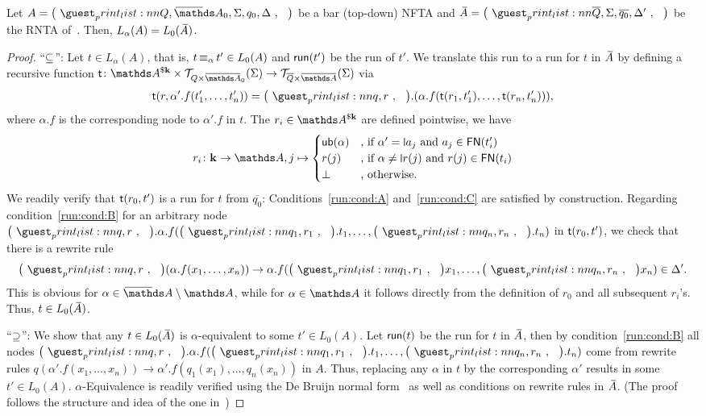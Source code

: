 \documentclass[a4paper,UKenglish,cleveref,autoref,thm-restate,numberwithinsect,final]{lipics-v2021}
\begin{document}
    \begin{proposition}
      Let $A = \maketuple{Q, \barNames_0, \Sigma, q_0, \Delta}$ be a bar (top-down) NFTA and $\barA =
      \maketuple{\overline{Q}, \Sigma, \overline{q_0}, \Delta'}$ be the RNTA of~. Then,
      $L_\alpha(A) = L_0(\barA)$.
    \end{proposition}
    \begin{proof}
      \noindent\enquote{$\subseteq$}: Let $t \in L_\alpha(A)$, that is, $t \operatorname{\equiv_{\alpha}} t' \in L_0(A)$ and $\textsf{run}(t')$
      be the run of $t'$. We translate this run to a run for $t$ in $\barA$ by defining a recursive function
      $\trans\colon \parnom{k} \times \bartree[Q \times \barNamess_0](\Sigma) \to \bartree[\overline{Q} \times
      \barNamess](\Sigma)$ via
      \[ \trans(r, \alpha'.f(t'_1, \dots, t'_n)) = \maketuple{q, r}.(\alpha.f(\trans(r_1, t'_1), \dots, \trans(r_n, t'_n))), \]
      where $\alpha.f$ is the corresponding node to $\alpha'.f$ in $t$. The $r_i \in \parnom{k}$ are defined pointwise,
      we have
      \[ r_i\colon \mathbf{k} \to \names, j \mapsto \begin{cases}
        \ub(\alpha) & \text{, if $\alpha' = \newletter{a_j}$ and $a_j \in \FN(t_i')$} \\
        r(j) & \text{, if $\alpha \neq \newletter{r(j)}$ and $r(j) \in \FN(t_i)$} \\
        \bot & \text{, otherwise.}
      \end{cases} \]
      We readily verify that $\mathsf{t}(r_0, t')$ is a run for $t$ from $\overline{q_0}$: Conditions~\ref{run:cond:A}
      and~\ref{run:cond:C} are satisfied by construction. Regarding condition~\ref{run:cond:B} for an arbitrary
      node $\maketuple{q,r}.\alpha.f(\maketuple{q_1, r_1}.t_1, \dots, \maketuple{q_n, r_n}.t_n)$ in $\mathsf{t}(r_0, t')$,
      we check that there is a rewrite rule \[\maketuple{q,r}(\alpha.f(x_1, \dots, x_n)) \to \alpha.f(\maketuple{q_1, r_1}x_1, \dots, \maketuple{q_n, r_n}x_n) \in \Delta'.\]
      This is obvious for $\alpha \in \barNames\setminus\names$,
      while for $\alpha \in \names$ it follows directly from the definition of $r_0$ and all subsequent $r_i$'s.
      Thus, $t \in L_0(\barA)$.

      \noindent\enquote{$\supseteq$}: We show that any $t \in L_0(\barA)$ is $\alpha$-equivalent to some $t' \in L_0(A)$.
      Let $\textsf{run}(t)$ be the run for $t$ in $\barA$, then by condition~\ref{run:cond:B} all nodes
      $\maketuple{q,r}.\alpha.f(\maketuple{q_1, r_1}.t_1, \dots, \maketuple{q_n, r_n}.t_n)$ come from rewrite rules
      $q(\alpha'.f(x_1, \dots, x_n)) \to \alpha'.f(q_1(x_1), \dots, q_n(x_n))$ in $A$. Thus, replacing any $\alpha$ in
      $t$ by the corresponding $\alpha'$ results in some $t' \in L_0(A)$. $\alpha$-Equivalence is readily verified using
      the De Bruijn normal form~ as well as conditions on rewrite rules in $\barA$. (The proof
      follows the structure and idea of the one in~)
    \end{proof}
\end{document}
